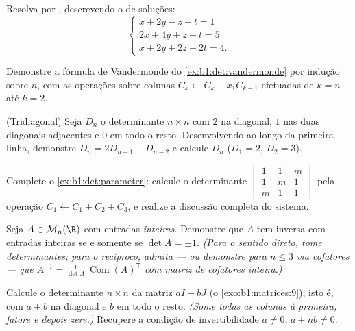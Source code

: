 \begin{exercise}[$\star$]\label{exo:b1:det:4}
Resolva por , descrevendo o  de soluções:
\[
\begin{cases}
x + 2y - z + t = 1\\
2x + 4y + z - t = 5\\
x + 2y + 2z - 2t = 4 .
\end{cases}
\]
\end{exercise}

\begin{exercise}[$\star\star$]\label{exo:b1:det:5}
Demonstre a fórmula de Vandermonde do \cref{ex:b1:det:vandermonde} por indução sobre $n$,
com as operações sobre colunas $C_k \leftarrow C_k -
x_1 C_{k-1}$ efetuadas de $k = n$ até
$k = 2$.
\end{exercise}

\begin{exercise}[$\star\star$]\label{exo:b1:det:6}
(Tridiagonal) Seja $D_n$ o determinante $n \times n$ com $2$ na diagonal,
$1$ nas duas diagonais adjacentes e $0$ em todo o resto.
Desenvolvendo ao longo da primeira linha, demonstre $D_n = 2D_{n-1} - D_{n-2}$ e calcule
$D_n$ ($D_1 = 2$, $D_2 = 3$).
\end{exercise}

\begin{exercise}[$\star\star$]\label{exo:b1:det:7}
Complete o \cref{ex:b1:det:parameter}: calcule o determinante $\begin{vmatrix} 1 & 1 & m\\ 1 & m & 1\\ m & 1 & 1\end{vmatrix}$ pela operação $C_1 \leftarrow C_1 + C_2 + C_3$,
e realize a discussão completa do sistema.
\end{exercise}

\begin{exercise}[$\star\star$]\label{exo:b1:det:8}
Seja $A \in \mathcal{M}_n(\R)$ com entradas \emph{inteiras}. Demonstre que $A$ tem
inversa com entradas inteiras se e somente se $\det A
= \pm 1$. \emph{(Para o
sentido direto, tome determinantes; para o recíproco, admita --- ou
demonstre para $n \leq 3$ via cofatores --- que $A^{-1} = \frac{1}{\det A}\,\operatorname{Com}(A)^{\mathsf T}$ com matriz de
cofatores inteira.)}
\end{exercise}

\begin{exercise}[$\star\star\star$]\label{exo:b1:det:9}
Calcule o determinante $n \times n$ da matriz $aI + bJ$ (o \cref{exo:b1:matrices:9}), isto é,
com $a + b$ na diagonal e $b$ em todo o resto. \emph{(Some todas as
colunas à primeira, fatore e depois zere.)} Recupere a condição de
invertibilidade $a \neq 0$, $a + nb
\neq 0$.
\end{exercise}

